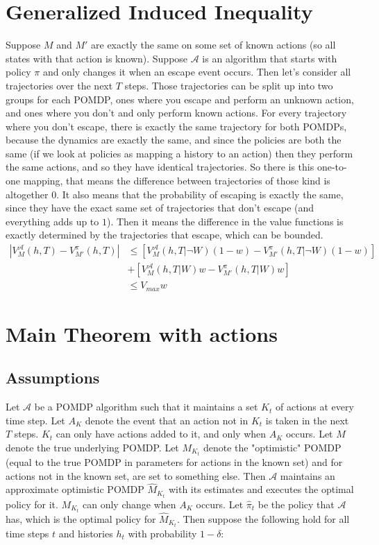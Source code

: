 \documentclass[10pt,english]{article}
\begin{document}
\section{Generalized Induced Inequality}
Suppose $M$ and $M'$ are exactly the same on some set of known actions (so all states with that action is known). Suppose $\mathcal{A}$ is an algorithm that starts with policy $\pi$ and only changes it when an escape event occurs. Then let's consider all trajectories over the next $T$ steps. Those trajectories can be split up into two groups for each POMDP, ones where you escape and perform an unknown action, and ones where you don't and only perform known actions. For every trajectory where you don't escape, there is exactly the same trajectory for both POMDPs, because the dynamics are exactly the same, and since the policies are both the same (if we look at policies as mapping a history to an action) then they perform the same actions, and so they have identical trajectories. So there is this one-to-one mapping, that means the difference between trajectories of those kind is altogether $0$. It also means that the probability of escaping is exactly the same, since they have the exact same set of trajectories that don't escape (and everything adds up to $1$). Then it means the difference in the value functions is exactly determined by the trajectories that escape, which can be bounded.
\begin{align}
|V^{\mathcal{A}}_M(h,T) - V^{\pi}_{M'}(h,T)| &\leq [V^{\mathcal{A}}_M(h,T|\neg W)(1-w) - V^{\pi}_{M'}(h,T|\neg W)(1-w)] \\
& + [V^{\mathcal{A}}_M(h,T|W)w - V^{\pi}_{M'}(h,T|W)w]\\
&\leq V_{max}w
\end{align}


\section{Main Theorem with actions}

\subsection{Assumptions}

Let $\mathcal{A}$ be a POMDP algorithm such that it maintains a set $K_t$ of actions at every time step. Let $A_K$ denote the event that an action not in $K_t$ is taken in the next $T$ steps. $K_t$ can only have actions added to it, and only when $A_K$ occurs. Let $M$ denote the true underlying POMDP. Let $M_{K_t}$ denote the "optimistic" POMDP (equal to the true POMDP in parameters for actions in the known set) and for actions not in the known set, are set to something else. Then $\mathcal{A}$ maintains an approximate optimistic POMDP $\widehat{M}_{K_t}$ with its estimates and executes the optimal policy for it. $M_{K_t}$ can only change when $A_K$ occurs. Let $\widehat{\pi}_t$ be the policy that $\mathcal{A}$ has, which is the optimal policy for $\widehat{M}_{K_t}$. Then suppose the following hold for all time steps $t$ and histories $h_t$ with probability $1-\delta$:
\end{document}
